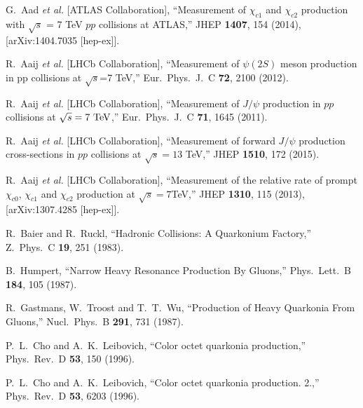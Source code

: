 \documentclass[aps,prc,preprint,superscriptaddress,showpacs,showkeys,amsmath]{revtex4-1}
\begin{document}
\begin{thebibliography}{100}
  G.~Aad {\it et al.} [ATLAS Collaboration],
  ``Measurement of $\chi_{c1}$ and $\chi_{c2}$ production with $\sqrt{s}$ = 7 TeV $pp$ collisions at ATLAS,''
  JHEP {\bf 1407}, 154 (2014), [arXiv:1404.7035 [hep-ex]].


  R.~Aaij {\it et al.} [LHCb Collaboration],
  ``Measurement of $\psi(2S)$ meson production in pp collisions at $\sqrt{s}$=7 TeV,''
  Eur.\ Phys.\ J.\ C {\bf 72}, 2100 (2012).


  R.~Aaij {\it et al.} [LHCb Collaboration],
  ``Measurement of $J/\psi$ production in $pp$ collisions at $\sqrt{s}=7~\rm{TeV}$,''
  Eur.\ Phys.\ J.\ C {\bf 71}, 1645 (2011).

  R.~Aaij {\it et al.} [LHCb Collaboration],
  ``Measurement of forward $J/\psi$ production cross-sections in $pp$ collisions at $\sqrt{s}=13$ TeV,''
  JHEP {\bf 1510}, 172 (2015).




  R.~Aaij {\it et al.} [LHCb Collaboration],
  ``Measurement of the relative rate of prompt $\chi_{c0}$, $\chi_{c1}$ and $\chi_{c2}$ production at $\sqrt{s}=7$TeV,''
  JHEP {\bf 1310}, 115 (2013), [arXiv:1307.4285 [hep-ex]].
 




  R.~Baier and R.~Ruckl,
  ``Hadronic Collisions: A Quarkonium Factory,''
  Z.\ Phys.\ C {\bf 19}, 251 (1983).


  B.~Humpert,
  ``Narrow Heavy Resonance Production By Gluons,''
  Phys.\ Lett.\ B {\bf 184}, 105 (1987).


  R.~Gastmans, W.~Troost and T.~T.~Wu,
  ``Production of Heavy Quarkonia From Gluons,''
  Nucl.\ Phys.\ B {\bf 291}, 731 (1987).


  P.~L.~Cho and A.~K.~Leibovich,
  ``Color octet quarkonia production,''
  Phys.\ Rev.\ D {\bf 53}, 150 (1996).


  P.~L.~Cho and A.~K.~Leibovich,
  ``Color octet quarkonia production. 2.,''
  Phys.\ Rev.\ D {\bf 53}, 6203 (1996).



\end{thebibliography}
\end{document}

